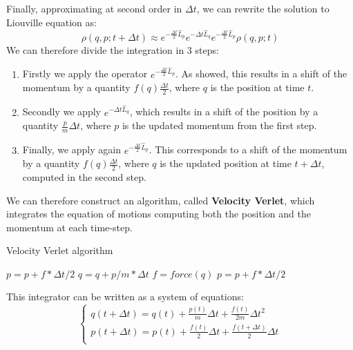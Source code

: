         Finally, approximating at second order in $\Delta t$, we can rewrite the solution to Liouville equation as:
        \begin{equation}
            \rho(q,p;t+\Delta t)\approx e^{-\frac{\Delta t}{2} \hat{L}_p}e^{-\Delta t \hat{L}_q}e^{-\frac{\Delta t}{2} \hat{L}_p} \rho(q,p;t)
        \end{equation}
        We can therefore divide the integration in 3 steps:
        \begin{enumerate}
            \item Firstly we apply the operator $e^{-\frac{\Delta t}{2} \hat{L}_p}$. As showed, this results in a shift of the momentum by a quantity $f(q)\frac{\Delta t}{2}$, where $q$ is the position at time $t$.
            \item Secondly we apply $e^{-\Delta t \hat{L}_q}$, which results in a shift of the position by a quantity $\frac{p}{m}\Delta t$, where $p$ is the updated momentum from the first step.
            \item Finally, we apply again $e^{-\frac{\Delta t}{2} \hat{L}_p}$. This corresponds to a shift of the momentum by a quantity $f(q)\frac{\Delta t}{2}$, where $q$ is the updated position at time $t+\Delta t$, computed in the second step.
        \end{enumerate}
        
        We can therefore construct an algorithm, called \textbf{Velocity Verlet}, which integrates the equation of motions computing both the position and the momentum at each time-step.
        
        \begin{algorithm}[H]
			\caption{Velocity Verlet algorithm}
            \label{alg:velocity_verlet}
			\begin{algorithmic}[1]
				\State $p=p+f*\Delta t/2$
				\State $q=q+p/m *\Delta t$
				\State$f=force(q)$
				\State $p=p+f*\Delta t/2$	
				\EndFor
			\end{algorithmic}
		\end{algorithm}
		
		This integrator can be written as a system of equations:
		\begin{equation}
		    \begin{cases}
		            q(t+\Delta t)=q(t)+\frac{p(t)}{m}\Delta t+\frac{f(t)}{2m}\Delta t^2\\
		            p(t+\Delta t)=p(t)+\frac{f(t)}{2}\Delta t+\frac{f(t+\Delta t)}{2}\Delta t\\
		    \end{cases}
		\end{equation}
		
